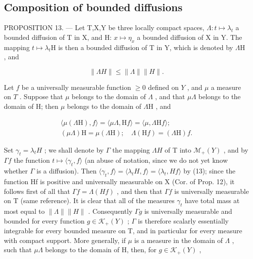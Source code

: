 \subsection{Composition of bounded diffusions}

PROPOSITION 13. --- Let T,X,Y be three locally compact spaces, \(\Lambda : t \mapsto \lambda_t\) a bounded diffusion of T in X, and H: \(x \mapsto \eta_x\) a bounded diffusion of X in Y. The mapping \(t \mapsto \lambda_t\mathrm{H}\) is then a bounded diffusion of T in Y, which is denoted by \(\Lambda\mathrm{H}\) , and

\[
\| \Lambda H \| \leqslant \| \Lambda \| \| H \|.\tag{14}
\]

Let \(f\) be a universally measurable function \(\geqslant 0\) defined on \(Y\) , and \(\mu\) a measure on \(T\) . Suppose that \(\mu\) belongs to the domain of \(\Lambda\) , and that \(\mu \Lambda\) belongs to the domain of H; then \(\mu\) belongs to the domain of \(\Lambda \mathrm{H}\) , and

\[
\begin{array}{l} \langle \mu (\Lambda \mathrm{H}), f \rangle = \langle \mu \Lambda , \mathrm{H} f \rangle = \langle \mu , \Lambda \mathrm{H} f \rangle ; \\ (\mu \Lambda) \mathrm{H} = \mu (\Lambda \mathrm{H}); \quad \Lambda (\mathrm{H} f) = (\Lambda \mathrm{H}) f. \end{array}\tag{15}
\]

Set \(\gamma_{t} = \lambda_{t}H\) ; we shall denote by \(\Gamma\) the mapping \(\Lambda H\) of T into \(\mathcal{M}_{+}(Y)\) , and by \(\Gamma f\) the function \(t \mapsto \langle \gamma_{t}, f \rangle\) (an abuse of notation, since we do not yet know whether \(\Gamma\) is a diffusion). Then \(\langle \gamma_{t}, f \rangle = \langle \lambda_{t}H, f \rangle = \langle \lambda_{t}, Hf \rangle\) by (13); since the function Hf is positive and universally measurable on X (Cor. of Prop. 12), it follows first of all that \(\Gamma f = \Lambda(Hf)\) , and then that \(\Gamma f\) is universally measurable on T (same reference). It is clear that all of the measures \(\gamma_{t}\) have total mass at most equal to \(\|\Lambda\| \|H\|\) . Consequently \(\Gamma g\) is universally measurable and bounded for every function \(g \in \mathcal{K}_{+}(Y)\) ; \(\Gamma\) is therefore scalarly essentially integrable for every bounded measure on T, and in particular for every measure with compact support. More generally, if \(\mu\) is a measure in the domain of \(\Lambda\) , such that \(\mu\Lambda\) belongs to the domain of H, then, for \(g \in \mathcal{K}_{+}(Y)\) ,

